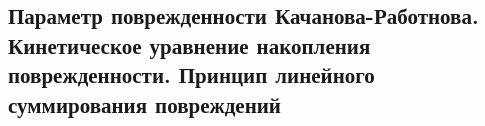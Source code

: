 

\subsection{Параметр поврежденности Качанова-Работнова. Кинетическое уравнение накопления поврежденности. Принцип линейного суммирования повреждений}



